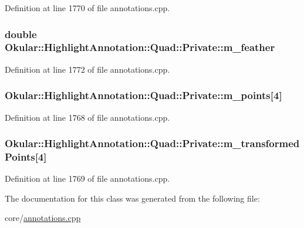 Definition at line 1770 of file annotations.\+cpp.

\hypertarget{classHighlightAnnotation_1_1Quad_1_1Private_a9330edf17dee0457e183dfcaa1daf6e4}{
\subsubsection[{m\+\_\+feather}]{\setlength{\rightskip}{0pt plus 5cm}double Okular\+::\+Highlight\+Annotation\+::\+Quad\+::\+Private\+::m\+\_\+feather}}\label{classHighlightAnnotation_1_1Quad_1_1Private_a9330edf17dee0457e183dfcaa1daf6e4}


Definition at line 1772 of file annotations.\+cpp.

\hypertarget{classHighlightAnnotation_1_1Quad_1_1Private_a33ccf7c730e1aa0104fa245eacc073be}{
\subsubsection[{m\+\_\+points}]{ Okular\+::\+Highlight\+Annotation\+::\+Quad\+::\+Private\+::m\+\_\+points\mbox{[}4\mbox{]}}}\label{classHighlightAnnotation_1_1Quad_1_1Private_a33ccf7c730e1aa0104fa245eacc073be}


Definition at line 1768 of file annotations.\+cpp.

\hypertarget{classHighlightAnnotation_1_1Quad_1_1Private_a2c44540ba5195db18fd64c41b05639ed}{
\subsubsection[{m\+\_\+transformed\+Points}]{ Okular\+::\+Highlight\+Annotation\+::\+Quad\+::\+Private\+::m\+\_\+transformed\+Points\mbox{[}4\mbox{]}}}\label{classHighlightAnnotation_1_1Quad_1_1Private_a2c44540ba5195db18fd64c41b05639ed}


Definition at line 1769 of file annotations.\+cpp.



The documentation for this class was generated from the following file\+:\begin{DoxyCompactItemize}
\item 
core/\hyperlink{annotations_8cpp}{annotations.\+cpp}\end{DoxyCompactItemize}

